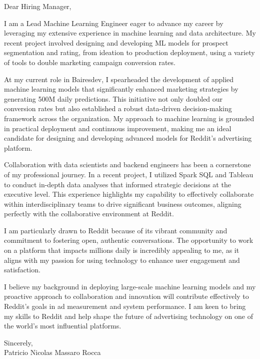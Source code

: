 \documentclass{article}
\begin{document}
\noindent Dear Hiring Manager,


I am a Lead Machine Learning Engineer eager to advance my career by leveraging my extensive experience in machine learning and data architecture. My recent project involved designing and developing ML models for prospect segmentation and rating, from ideation to production deployment, using a variety of tools to double marketing campaign conversion rates.


At my current role in Bairesdev, I spearheaded the development of applied machine learning models that significantly enhanced marketing strategies by generating 500M daily predictions. This initiative not only doubled our conversion rates but also established a robust data-driven decision-making framework across the organization. My approach to machine learning is grounded in practical deployment and continuous improvement, making me an ideal candidate for designing and developing advanced models for Reddit's advertising platform.


Collaboration with data scientists and backend engineers has been a cornerstone of my professional journey. In a recent project, I utilized Spark SQL and Tableau to conduct in-depth data analyses that informed strategic decisions at the executive level. This experience highlights my capability to effectively collaborate within interdisciplinary teams to drive significant business outcomes, aligning perfectly with the collaborative environment at Reddit.


I am particularly drawn to Reddit because of its vibrant community and commitment to fostering open, authentic conversations. The opportunity to work on a platform that impacts millions daily is incredibly appealing to me, as it aligns with my passion for using technology to enhance user engagement and satisfaction.


I believe my background in deploying large-scale machine learning models and my proactive approach to collaboration and innovation will contribute effectively to Reddit's goals in ad measurement and system performance. I am keen to bring my skills to Reddit and help shape the future of advertising technology on one of the world's most influential platforms.

\vspace{1cm}
\setlength{\parskip}{0em}
\begin{flushright}
Sincerely,\\
Patricio Nicolas Massaro Rocca
\end{flushright}
\end{document}

